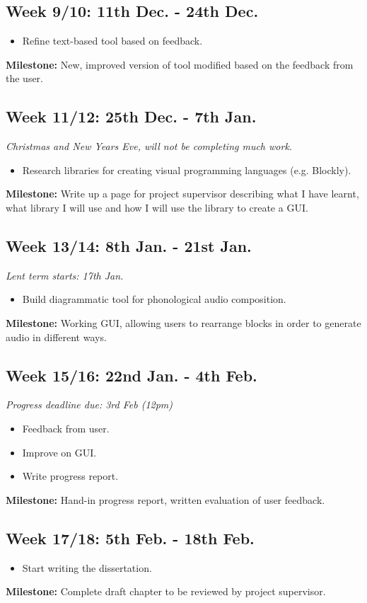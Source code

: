 \documentclass{article}
\begin{document}
\subsection*{Week 9/10: 11th Dec. - 24th Dec.}
\begin{itemize}
    \item Refine text-based tool based on feedback.
\end{itemize}
{
\centering\textbf{Milestone:} New, improved version of tool modified based on the feedback from the user.
}
\subsection*{Week 11/12: 25th Dec. - 7th Jan.}
\textit{Christmas and New Years Eve, will not be completing much work.}
\begin{itemize}
    \item Research libraries for creating visual programming languages (e.g. Blockly).
\end{itemize}
{
\centering\textbf{Milestone:} Write up a page for project supervisor describing what I have learnt, what library I will use and how I will use the library to create a GUI.
}
\subsection*{Week 13/14: 8th Jan. - 21st Jan.}
\textit{Lent term starts: 17th Jan.}
\begin{itemize}
    \item Build diagrammatic tool for phonological audio composition.
\end{itemize}
{
\centering\textbf{Milestone:} Working GUI, allowing users to rearrange blocks in order to generate audio in different ways.
}
\subsection*{Week 15/16: 22nd Jan. - 4th Feb.}
\textit{Progress deadline due: 3rd Feb (12pm)}
\begin{itemize}
    \item Feedback from user.
    \item Improve on GUI.
    \item Write progress report.
\end{itemize}
{
\centering\textbf{Milestone:} Hand-in progress report, written evaluation of user feedback.
}
\subsection*{Week 17/18: 5th Feb. - 18th Feb.}
\begin{itemize}
    \item Start writing the dissertation.
\end{itemize}
{
\centering\textbf{Milestone:} Complete draft chapter to be reviewed by project supervisor.
}
\end{document}
